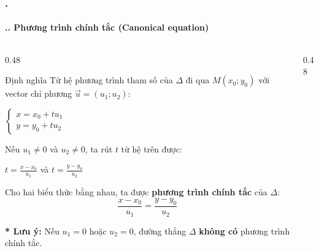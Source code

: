 \documentclass[11pt, aspectratio=169]{beamer}
\begin{document}
\begin{frame}[fragile]
    \frametitle{\thesection. \insertsection}
    \framesubtitle{\thesection.\thesubsection. Phương trình chính tắc (Canonical equation)}
    \vspace{-0.5cm}
    \begin{columns}[T, onlytextwidth]
        \begin{column}{0.48\textwidth}
            \begin{block}{Định nghĩa}
                \footnotesize
                Từ hệ phương trình tham số của $\Delta$ đi qua $M(x_0; y_0)$ với vector chỉ phương $\vec{u} = (u_1; u_2)$:
                
                \centering $\begin{cases} x = x_0 + tu_1 \\ y = y_0 + tu_2 \end{cases}$
                \flushleft
                
                Nếu $u_1 \neq 0$ và $u_2 \neq 0$, ta rút $t$ từ hệ trên được:
                
                \centering $t = \frac{x - x_0}{u_1}$ \quad và \quad $t = \frac{y - y_0}{u_2}$
                \flushleft
                
                Cho hai biểu thức bằng nhau, ta được \textbf{phương trình chính tắc} của $\Delta$:
                \[
                    \boxed{ \frac{x - x_0}{u_1} = \frac{y - y_0}{u_2} }
                \]
            \end{block}
            

            \footnotesize
            \textbf{* Lưu ý:} Nếu $u_1 = 0$ hoặc $u_2 = 0$, đường thẳng $\Delta$ \textbf{không có} phương trình chính tắc.
        \end{column}
        
        \begin{column}{0.48\textwidth}
            \centering
            \vspace{0.1cm}
\end{column}
\end{columns}
\end{frame}
\end{document}

